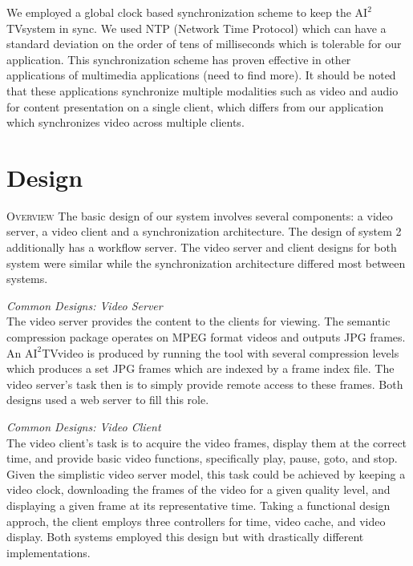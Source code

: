 \documentclass[10pt]{article}
\newcommand{\aiitv}[0]{$\mathrm{AI}^2$TV}
\begin{document}

We employed a global clock based synchronization scheme to keep the
\aiitv system in sync.  We used NTP (Network Time Protocol) \citep{NTP}
which can have a standard deviation on the order of tens of
milliseconds \citep{COX} which is tolerable for our application.  This
synchronization scheme has proven effective in other applications of
multimedia applications \citep{KIM} (need to find more).  It should be
noted that these applications synchronize multiple modalities such as
video and audio for content presentation on a single client, which
differs from our application which synchronizes video across multiple
clients.

\section{Design} \label{design}

\textsc{Overview}
The basic design of our system involves several components: a video
server, a video client and a synchronization architecture.  The design
of system 2 additionally has a workflow server.  The video server and
client designs for both system were similar while the synchronization
architecture differed most between systems.

\textit{Common Designs: Video Server}  \\
The video server provides the content to the clients for viewing.  The
semantic compression package operates on MPEG format videos and
outputs JPG frames.  An \aiitv video is produced by running the tool
with several compression levels which produces a set JPG frames which
are indexed by a frame index file.  The video server's task then is to
simply provide remote access to these frames.  Both designs used a web
server to fill this role.

\textit{Common Designs: Video Client}  \\
The video client's task is to acquire the video frames, display them
at the correct time, and provide basic video functions, specifically
play, pause, goto, and stop.  Given the simplistic video server model,
this task could be achieved by keeping a video clock, downloading the
frames of the video for a given quality level, and displaying a given
frame at its representative time.  Taking a functional design approch,
the client employs three controllers for time, video cache, and video
display.  Both systems employed this design but with drastically
different implementations.
\end{document}
